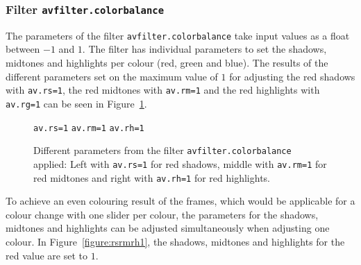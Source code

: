 \documentclass[../MasterThesis.tex]{subfiles}
\begin{document}
\subsubsection*{Filter \texttt{avfilter.colorbalance}}

The parameters of the filter \texttt{avfilter.colorbalance} take input values as a float between $-1$ and $1$. The filter has individual parameters to set the shadows, midtones and highlights per colour (red, green and blue). The results of the different parameters set on the maximum value of $1$ for adjusting the red shadows with \texttt{av.rs=1}, the red midtones with \texttt{av.rm=1} and the red highlights with \texttt{av.rg=1} can be seen in Figure~\ref{figure:rs1rm1rh1}.

\begin{figure}[H]
	\begin{center}
		\small{
		\texttt{av.rs=1} \hspace*{0.22\textwidth} \texttt{av.rm=1} \hspace*{0.23\textwidth} \texttt{av.rh=1}}
		\caption[Different parameters from the filter \texttt{avfilter.colorbalance} applied.]{Different parameters from the filter \texttt{avfilter.colorbalance} applied: Left with \texttt{av.rs=1} for red shadows, middle with \texttt{av.rm=1} for red midtones and right with \texttt{av.rh=1} for red highlights.}
			\label{figure:rs1rm1rh1}
	\end{center}
\end{figure}

To achieve an even colouring result of the frames, which would be applicable for a colour change with one slider per colour, the parameters for the shadows, midtones and highlights can be adjusted simultaneously when adjusting one colour. In Figure~\ref{figure:rsrmrh1}, the shadows, midtones and highlights for the red value are set to $1$. 
\end{document}
